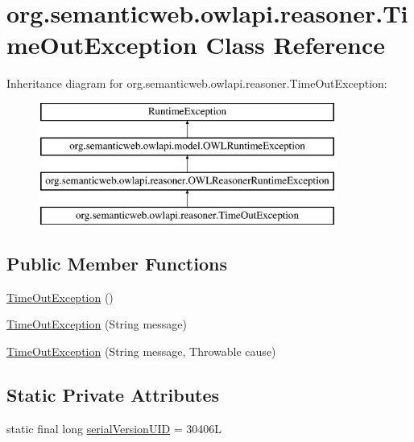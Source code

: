 \hypertarget{classorg_1_1semanticweb_1_1owlapi_1_1reasoner_1_1_time_out_exception}{\section{org.\-semanticweb.\-owlapi.\-reasoner.\-Time\-Out\-Exception Class Reference}
\label{classorg_1_1semanticweb_1_1owlapi_1_1reasoner_1_1_time_out_exception}
}
Inheritance diagram for org.\-semanticweb.\-owlapi.\-reasoner.\-Time\-Out\-Exception\-:\begin{figure}[H]
\begin{center}
\leavevmode
\includegraphics[height=4.000000cm]{classorg_1_1semanticweb_1_1owlapi_1_1reasoner_1_1_time_out_exception}
\end{center}
\end{figure}
\subsection*{Public Member Functions}
\begin{DoxyCompactItemize}
\item 
\hyperlink{classorg_1_1semanticweb_1_1owlapi_1_1reasoner_1_1_time_out_exception_addef7aa9660a667296d3ae82f4f15a80}{Time\-Out\-Exception} ()
\item 
\hyperlink{classorg_1_1semanticweb_1_1owlapi_1_1reasoner_1_1_time_out_exception_aa32185ca62248eb9214c1a084afae806}{Time\-Out\-Exception} (String message)
\item 
\hyperlink{classorg_1_1semanticweb_1_1owlapi_1_1reasoner_1_1_time_out_exception_a65dd05c76ba76cd03f93565715bd4b56}{Time\-Out\-Exception} (String message, Throwable cause)
\end{DoxyCompactItemize}
\subsection*{Static Private Attributes}
\begin{DoxyCompactItemize}
\item 
static final long \hyperlink{classorg_1_1semanticweb_1_1owlapi_1_1reasoner_1_1_time_out_exception_a878b6ae0facb4d14d1f29c66b4b51b7d}{serial\-Version\-U\-I\-D} = 30406\-L
\end{DoxyCompactItemize}


